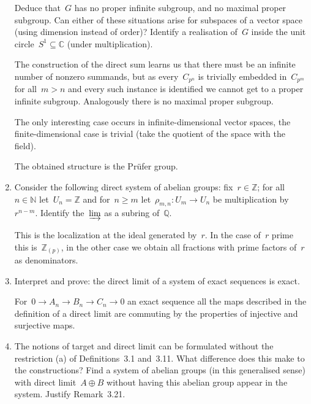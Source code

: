 \documentclass[a4paper,11pt,oneside,openany,article]{memoir}
\begin{document}
\begin{enumerate}
    Deduce that~$G$ has no proper infinite subgroup, and no maximal proper subgroup. Can either of these situations arise for subspaces of a vector space (using dimension instead of order)? Identify a realisation of~$G$ inside the unit circle~$S^1\subseteq\mathbb{C}$ (under multiplication).

    \begin{solution}
      The construction of the direct sum learns us that there must be an infinite number of nonzero summands, but as every~$C_{p^n}$ is trivially embedded in~$C_{p^m}$ for all~$m>n$ and every such instance is identified we cannot get to a proper infinite subgroup. Analogously there is no maximal proper subgroup.

      The only interesting case occurs in infinite-dimensional vector spaces, the finite-dimensional case is trivial (take the quotient of the space with the field).

      The obtained structure is the Pr\"ufer group.
    \end{solution}

  \item Consider the following direct system of abelian groups: fix~$r\in\mathbb{Z}$; for all~$n\in\mathbb{N}$ let~$U_n=\mathbb{Z}$ and for~$n\geq m$ let~$\rho_{m,n}\colon U_m\to U_n$ be multiplication by~$r^{n-m}$. Identify the~$\varinjlim$ as a subring of~$\mathbb{Q}$.

    \begin{solution}
      This is the localization at the ideal generated by~$r$. In the case of~$r$ prime this is~$\mathbb{Z}_{(p)}$, in the other case we obtain all fractions with prime factors of~$r$ as denominators.
    \end{solution}

  \item Interpret and prove: the direct limit of a system of exact sequences is exact.

    \begin{solution}
      For~$0\to A_n\to B_n\to C_n\to 0$ an exact sequence all the maps described in the definition of a direct limit are commuting by the properties of injective and surjective maps.
    \end{solution}

  \item The notions of target and direct limit can be formulated without the restriction (a) of Definitions~3.1 and~3.11. What difference does this make to the constructions? Find a system of abelian groups (in this generalised sense) with direct limit~$A\oplus B$ without having this abelian group appear in the system. Justify Remark~3.21.


\end{enumerate}
\end{document}
